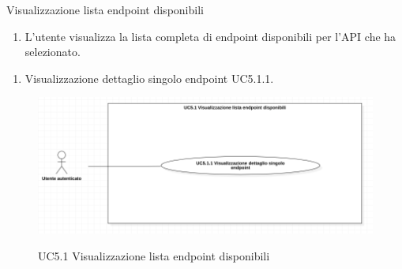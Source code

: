 \begin{usecase}{5.1}{Visualizzazione lista endpoint disponibili}\label{uc:visualizzazione-lista-endpoint-disponibili}

    \usecasemain{}
        \begin{enumerate}
            \item L'utente visualizza la lista completa di endpoint disponibili per l'API che ha selezionato.
        \end{enumerate}

        \begin{enumerate}
            \item Visualizzazione dettaglio singolo endpoint UC5.1.1.
        \end{enumerate}

\end{usecase}

\begin{figure}[!ht] 
    \centering 
    \includegraphics[width=0.85\columnwidth, alt={Caso d'uso relativo al visualizzazione della lista di endpoint disponibili}]{images/usecase/UC5.1.jpg}
    \caption{UC5.1 Visualizzazione lista endpoint disponibili}\label{fig:uc:visualizzazione-lista-endpoint-disponibili}
  \end{figure}


